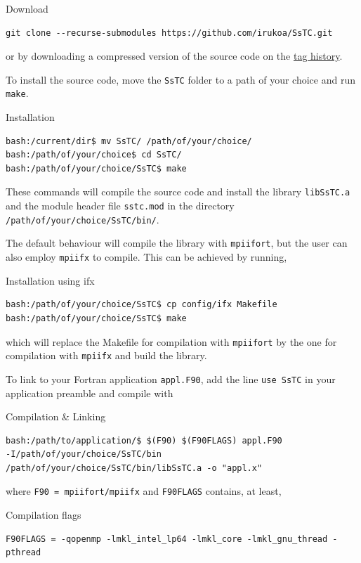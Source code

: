 \documentclass[10pt,a4paper]{article}
\begin{document}
\begin{codebox}{Download}
\begin{verbatim}
git clone --recurse-submodules https://github.com/irukoa/SsTC.git
\end{verbatim}
\end{codebox}
or by downloading a compressed version of the source code on the \href{https://github.com/irukoa/SsTC/tags}{tag history}.

To install the source code, move the \verb|SsTC| folder to a path of your choice and run \verb|make|.
\begin{codebox}{Installation}
\begin{verbatim}
bash:/current/dir$ mv SsTC/ /path/of/your/choice/
bash:/path/of/your/choice$ cd SsTC/
bash:/path/of/your/choice/SsTC$ make
\end{verbatim}
\end{codebox}
These commands will compile the source code and install the library \verb|libSsTC.a| and the module header file \verb|sstc.mod| in the directory \verb|/path/of/your/choice/SsTC/bin/|.

The default behaviour will compile the library with \verb|mpiifort|, but the user can also employ \verb|mpiifx| to compile. This can be achieved by running,
\begin{codebox}{Installation using ifx}
\begin{verbatim}
bash:/path/of/your/choice/SsTC$ cp config/ifx Makefile
bash:/path/of/your/choice/SsTC$ make
\end{verbatim}
\end{codebox}
which will replace the Makefile for compilation with \verb|mpiifort| by the one for compilation with \verb|mpiifx| and build the library.

To link to your Fortran application \verb|appl.F90|, add the line \verb|use SsTC| in your application preamble and compile with
\begin{codebox}{Compilation \& Linking}
\begin{verbatim}
bash:/path/to/application/$ $(F90) $(F90FLAGS) appl.F90
-I/path/of/your/choice/SsTC/bin
/path/of/your/choice/SsTC/bin/libSsTC.a -o "appl.x"
\end{verbatim}
\end{codebox}
where \verb|F90 = mpiifort/mpiifx| and \verb|F90FLAGS| contains, at least,
\begin{codebox}{Compilation flags}
\begin{verbatim}
F90FLAGS = -qopenmp -lmkl_intel_lp64 -lmkl_core -lmkl_gnu_thread -pthread
\end{verbatim}
\end{codebox}
\end{document}
